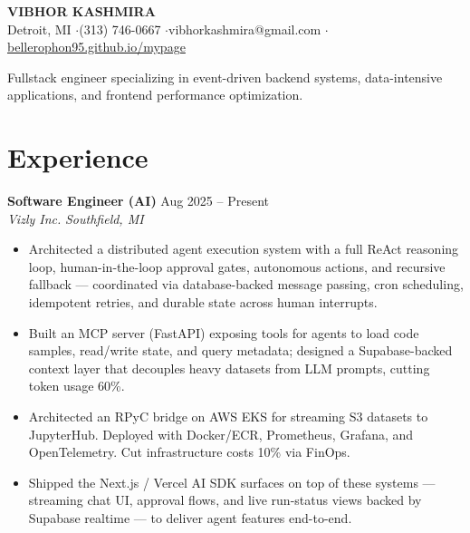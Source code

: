 \documentclass[10pt,letterpaper]{article}
\newcommand{\role}[4]{%
  \vspace{2pt}
  \noindent\textbf{#1} \hfill #2 \\
  \textit{#3} \hfill \textit{#4}
  \vspace{1pt}
}
\begin{document}
\begin{center}
  {\Large\bfseries VIBHOR KASHMIRA} \\[2pt]
  Detroit, MI \enspace$\cdot$\enspace (313) 746-0667 \enspace$\cdot$\enspace vibhorkashmira@gmail.com \enspace$\cdot$\enspace \href{https://bellerophon95.github.io/mypage}{bellerophon95.github.io/mypage}
\end{center}

\vspace{-6pt}
\noindent Fullstack engineer specializing in event-driven backend systems, data-intensive applications, and frontend performance optimization.

\section{Experience}

\role{Software Engineer (AI)}{Aug 2025 -- Present}{Vizly Inc.}{Southfield, MI}
\begin{itemize}
  \item Architected a distributed agent execution system with a full ReAct reasoning loop, human-in-the-loop approval gates, autonomous actions, and recursive fallback --- coordinated via database-backed message passing, cron scheduling, idempotent retries, and durable state across human interrupts.
  \item Built an MCP server (FastAPI) exposing tools for agents to load code samples, read/write state, and query metadata; designed a Supabase-backed context layer that decouples heavy datasets from LLM prompts, cutting token usage 60\%.
  \item Architected an RPyC bridge on AWS EKS for streaming S3 datasets to JupyterHub. Deployed with Docker/ECR, Prometheus, Grafana, and OpenTelemetry. Cut infrastructure costs 10\% via FinOps.
  \item Shipped the Next.js / Vercel AI SDK surfaces on top of these systems --- streaming chat UI, approval flows, and live run-status views backed by Supabase realtime --- to deliver agent features end-to-end.
\end{itemize}
\end{document}
